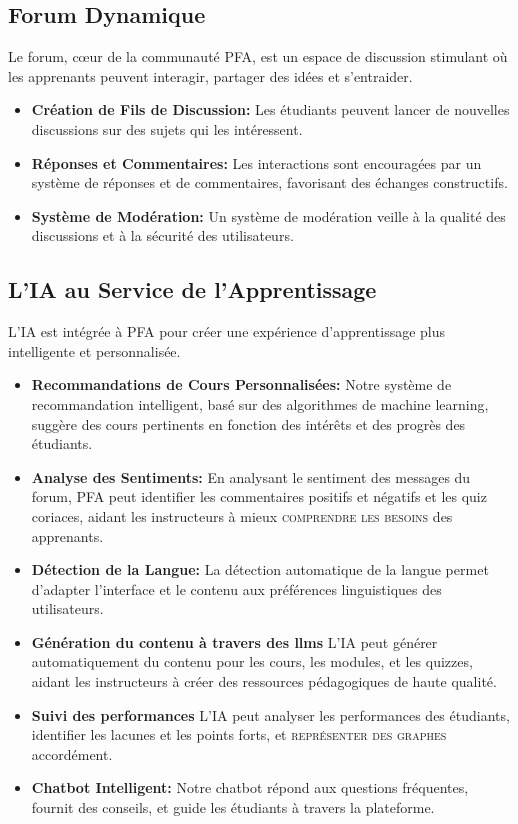 \subsection{Forum Dynamique}

Le forum, cœur de la communauté PFA, est un espace de discussion stimulant où les apprenants peuvent interagir, partager des idées et s'entraider.

\begin{itemize}
    \item \textbf{Création de Fils de Discussion:} Les étudiants peuvent lancer de nouvelles discussions sur des sujets qui les intéressent.
    \item \textbf{Réponses et Commentaires:} Les interactions sont encouragées par un système de réponses et de commentaires, favorisant des échanges constructifs.
    \item \textbf{Système de Modération:} Un système de modération veille à la qualité des discussions et à la sécurité des utilisateurs.
\end{itemize}

\subsection{L'IA au Service de l'Apprentissage}

L'IA est intégrée à PFA pour créer une expérience d'apprentissage plus intelligente et personnalisée.

\begin{itemize}
    \item \textbf{Recommandations de Cours Personnalisées:} Notre système de recommandation intelligent, basé sur des algorithmes de machine learning, suggère des cours pertinents en fonction des intérêts et des progrès des étudiants.
    \item \textbf{Analyse des Sentiments:} En analysant le sentiment des messages du forum, PFA peut identifier les commentaires positifs et négatifs et les quiz coriaces, aidant les instructeurs à mieux \textsc{comprendre les besoins} des apprenants.
    \item \textbf{Détection de la Langue:} La détection automatique de la langue permet d'adapter l'interface et le contenu aux préférences linguistiques des utilisateurs.
    \item \textbf{Génération du contenu à travers des \gls{llm}s} L'IA peut générer automatiquement du contenu pour les cours, les modules, et les quizzes, aidant les instructeurs à créer des ressources pédagogiques de haute qualité.
    \item \textbf{Suivi des performances} L'IA peut analyser les performances des étudiants, identifier les lacunes et les points forts, et \textsc{représenter des graphes} accordément.
    \item \textbf{Chatbot Intelligent:} Notre chatbot répond aux questions fréquentes, fournit des conseils, et guide les étudiants à travers la plateforme.
\end{itemize}

